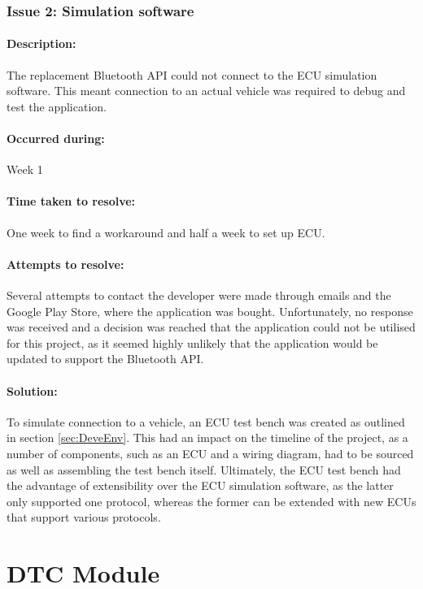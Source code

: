 		\subsubsection{Issue 2: Simulation software}{
			\paragraph{Description:}
			The replacement Bluetooth API could not connect to the ECU simulation software. This meant connection to an actual vehicle was required to debug and test the application.
			
			\paragraph{Occurred during:}
			Week 1
			\paragraph{Time taken to resolve:}
			One week to find a workaround and half a week to set up ECU.
			\paragraph{Attempts to resolve:}
			Several attempts to contact the developer were made through emails and the Google Play Store, where the application was bought. Unfortunately, no response was received and a decision was reached that the application could not be utilised for this project, as it seemed highly unlikely that the application would be updated to support the Bluetooth API. 
			\paragraph{Solution:}
			To simulate connection to a vehicle, an ECU test bench was created as outlined in section \ref{sec:DeveEnv}. This had an impact on the timeline of the project, as a number of components, such as an ECU and a wiring diagram, had to be sourced as well as assembling the test bench itself. Ultimately, the ECU test bench had the advantage of extensibility over the ECU simulation software, as the latter only supported one protocol, whereas the former can be extended with new ECUs that support various protocols.
		}
		\label{ssec:SimSoftware}		

\section{DTC Module}
